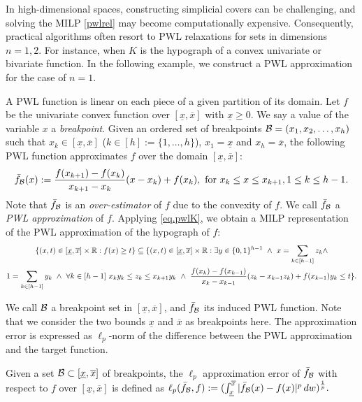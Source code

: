 In high-dimensional spaces, constructing simplicial covers can be challenging, and solving the MILP \eqref{pwlrel} may become computationally expensive. Consequently, practical algorithms often resort to PWL relaxations for sets in dimensions $n = 1, 2$. For instance, when $K$ is the hypograph of a convex univariate or bivariate function. In the following example, we construct a PWL approximation for the case of $n=1$.

A PWL function is linear on each piece of a given partition of its domain.  Let  \(f\) be the univariate convex function over $[\underline{x},\overline{x}]$ with $\underline{x} \ge 0$. We say a value of the variable \(x\) a \emph{breakpoint}. Given an ordered set of breakpoints \(\mathcal B = (x_1, x_2,\hdots, x_h)\) such that \(x_k \in [\underline{x},\overline{x}]\) ($k \in [h]:=\{1,\ldots,h\}$), $x_1 = \underline{x}$ and $x_h = \overline{x}$, the following PWL function approximates \(f\) over the domain \([\underline{x},\overline{x}]\):
\begin{equation*}
   \bar{f}_{\mathcal B}(x):=
        \frac{f(x_{k+1})-f(x_{k})}{x_{k+1}-x_{k}}(x-x_{k}) + f(x_{k}), \textup{ for } x_{k}\leq x \leq x_{k+1}, 1 \le k \le h-1.
\end{equation*}
Note that $ \bar{f}_{\mathcal B}$ is  an \textit{over-estimator} of  $f$ due to the convexity of $f$. We call $\bar{f}_{\mathcal B}$ a \emph{PWL approximation} of $f$.  Applying \eqref{eq.pwlK}, we obtain a MILP representation of the PWL approximation of the hypograph of $f$:
\begin{multline}
    \{(x,t) \in [\underline{x},\overline{x}] \times \bR: f(x) \ge t\} \subseteq   \{(x,t) \in [\underline{x},\overline{x}] \times \bR: \exists  y \in \{0,1\}^{h-1} \ \land\ x=\sum_{k \in [h-1]} z_k  \land \\  1 = \sum_{k \in [h-1]}y_{k}  \ \land  \ \forall k \in [h-1] \  x_{k} y_{k} \le z_{k} \le x_{k+1} y_{k} \ \land \ \frac{f(x_k)-f(x_{k-1})}{x_{k}-x_{k-1}}(z_{k}-x_{k-1}z_{k})  + f(x_{k-1}) y_{k}\le t\}.
\end{multline}

We call \(\mathcal B\) a breakpoint set in \([\underline{x},\overline{x}]\), and \(\bar{f}_{\mathcal B}\) its  induced PWL function. Note that we consider the two bounds  \(\underline{x}\) and \(\overline{x}\) as breakpoints here. The approximation error is expressed as $\ell_p$-norm of the difference between the PWL approximation and the target function.




\begin{definition}
Given a set \(\mathcal B \subset [\underline{x}, \overline{x}]\) of breakpoints, the \(\ell_p\) approximation error of \(\bar{f}_{\mathcal B}\) with respect to \(f\) over \([\underline{x},\overline{x}]\) is defined as \(\ell_p(\bar{f}_{\mathcal B}, f) := (\int_{ \underline{x}}^{\overline{x}}|\bar{f}_{\mathcal B}(x) - f(x)|^p \,dw)^{\frac{1}{p}}. \)
\end{definition}


